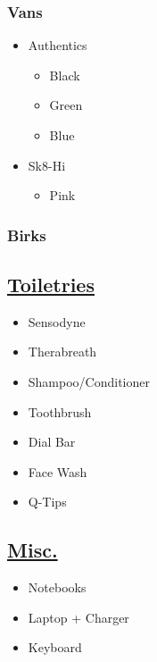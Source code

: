 \documentclass[11pt]{article}
\begin{document}
\subsubsection*{Vans}
\label{sec:org378f7ea}
\begin{itemize}
\item Authentics
\label{sec:org4ad4242}
\begin{itemize}
\item[{$\square$}] Black
\item[{$\square$}] Green
\item[{$\square$}] Blue
\end{itemize}
\item Sk8-Hi
\label{sec:org93d63a4}
\begin{itemize}
\item[{$\square$}] Pink
\end{itemize}
\end{itemize}
\subsubsection*{Birks}
\label{sec:orgb610648}
\subsection*{\underline{Toiletries}}
\label{sec:org24b2abe}
\begin{itemize}
\item[{$\square$}] Sensodyne
\item[{$\square$}] Therabreath
\item[{$\square$}] Shampoo/Conditioner
\item[{$\square$}] Toothbrush
\item[{$\square$}] Dial Bar
\item[{$\square$}] Face Wash
\item[{$\square$}] Q-Tips
\end{itemize}
\subsection*{\underline{Misc.}}
\label{sec:org18373c1}
\begin{itemize}
\item[{$\square$}] Notebooks
\item[{$\square$}] Laptop + Charger
\item[{$\square$}] Keyboard
\end{itemize}
\end{document}
